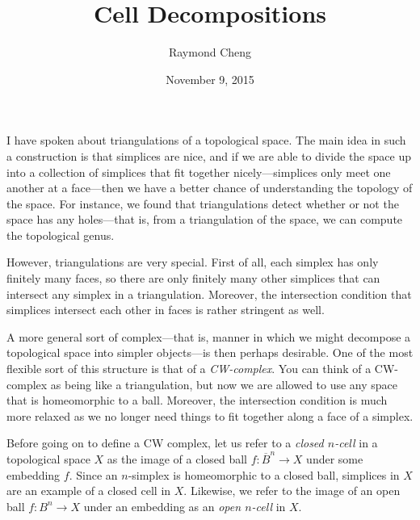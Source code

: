 \documentclass{axolotl}
\title{Cell Decompositions}
\author{Raymond Cheng}
\date{November 9, 2015}
\begin{document}
\maketitle
{}
I have spoken about triangulations of a topological space. The main idea in
such a construction is that simplices are nice, and if we are able to divide
the space up into a collection of simplices that fit together
nicely---simplices only meet one another at a face---then we have a better
chance of understanding the topology of the space. For instance, we found that
triangulations detect whether or not the space has any holes---that is, from a
triangulation of the space, we can compute the topological genus.

However, triangulations are very special. First of all, each simplex has only
finitely many faces, so there are only finitely many other simplices that can
intersect any simplex in a triangulation. Moreover, the intersection condition
that simplices intersect each other in faces is rather stringent as well.

A more general sort of complex---that is, manner in which we might decompose
a topological space into simpler objects---is then perhaps desirable. One of
the most flexible sort of this structure is that of a \emph{CW-complex}. You
can think of a CW-complex as being like a triangulation, but now we are allowed
to use any space that is homeomorphic to a ball. Moreover, the intersection
condition is much more relaxed as we no longer need things to fit together
along a face of a simplex.

Before going on to define a CW complex, let us refer to a \emph{closed
\(n\)-cell} in a topological space \(X\) as the image of a closed ball
\(f: \overline B^n \to X\) under some embedding \(f\). Since an \(n\)-simplex
is homeomorphic to a closed ball, simplices in \(X\) are an example of a closed
cell in \(X\). Likewise, we refer to the image of an open ball \(f: B^n \to X\)
under an embedding as an \emph{open \(n\)-cell} in \(X\).
\end{document}
